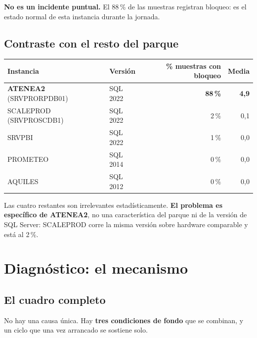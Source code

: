 \documentclass[11pt,a4paper]{article}
\newcommand{\critico}[1]{\textcolor{rojo}{\textbf{#1}}}
\begin{document}
\textbf{No es un incidente puntual.} El 88\,\% de las muestras registran
bloqueo: es el estado normal de esta instancia durante la jornada.

\subsection{Contraste con el resto del parque}

\begin{table}[h]
\centering
\small
\begin{tabular}{llrr}
\toprule
\textbf{Instancia} & \textbf{Versión} & \textbf{\% muestras con bloqueo} &
\textbf{Media} \\
\midrule
\critico{ATENEA2} (SRVPRORPDB01) & SQL 2022 & \critico{88\,\%} & \critico{4,9} \\
SCALEPROD (SRVPROSCDB1)          & SQL 2022 & 2\,\% & 0,1 \\
SRVPBI                           & SQL 2022 & 1\,\% & 0,0 \\
PROMETEO                         & SQL 2014 & 0\,\% & 0,0 \\
AQUILES                          & SQL 2012 & 0\,\% & 0,0 \\
\bottomrule
\end{tabular}
\end{table}

Las cuatro restantes son irrelevantes estadísticamente. \textbf{El problema
es específico de ATENEA2}, no una característica del parque ni de la versión
de SQL Server: SCALEPROD corre la misma versión sobre hardware comparable y
está al 2\,\%.

\newpage
\section{Diagnóstico: el mecanismo}

\subsection{El cuadro completo}

No hay una causa única. Hay \textbf{tres condiciones de fondo} que se
combinan, y un ciclo que una vez arrancado se sostiene solo.
\end{document}
